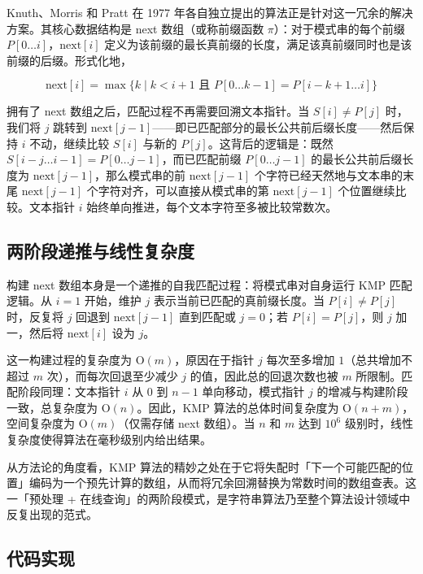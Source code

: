 \documentclass[12pt, a4paper]{academics}
\begin{document}
Knuth、Morris 和 Pratt 在 1977 年各自独立提出的算法正是针对这一冗余的解决方案。其核心数据结构是 next 数组（或称前缀函数 $\pi$）：对于模式串的每个前缀 $P[0 \dots i]$，$\mathrm{next}[i]$ 定义为该前缀的最长真前缀的长度，满足该真前缀同时也是该前缀的后缀。形式化地，

\[
\mathrm{next}[i] = \max\{ k \mid k < i + 1 \text{ 且 } P[0 \dots k-1] = P[i-k+1 \dots i] \}
\]

拥有了 next 数组之后，匹配过程不再需要回溯文本指针。当 $S[i] \neq P[j]$ 时，我们将 $j$ 跳转到 $\mathrm{next}[j-1]$——即已匹配部分的最长公共前后缀长度——然后保持 $i$ 不动，继续比较 $S[i]$ 与新的 $P[j]$。这背后的逻辑是：既然 $S[i-j \dots i-1] = P[0 \dots j-1]$，而已匹配前缀 $P[0 \dots j-1]$ 的最长公共前后缀长度为 $\mathrm{next}[j-1]$，那么模式串的前 $\mathrm{next}[j-1]$ 个字符已经天然地与文本串的末尾 $\mathrm{next}[j-1]$ 个字符对齐，可以直接从模式串的第 $\mathrm{next}[j-1]$ 个位置继续比较。文本指针 $i$ 始终单向推进，每个文本字符至多被比较常数次。

\subsection{两阶段递推与线性复杂度}

构建 next 数组本身是一个递推的自我匹配过程：将模式串对自身运行 KMP 匹配逻辑。从 $i = 1$ 开始，维护 $j$ 表示当前已匹配的真前缀长度。当 $P[i] \neq P[j]$ 时，反复将 $j$ 回退到 $\mathrm{next}[j-1]$ 直到匹配或 $j = 0$；若 $P[i] = P[j]$，则 $j$ 加一，然后将 $\mathrm{next}[i]$ 设为 $j$。

这一构建过程的复杂度为 $\mathrm{O}(m)$，原因在于指针 $j$ 每次至多增加 $1$（总共增加不超过 $m$ 次），而每次回退至少减少 $j$ 的值，因此总的回退次数也被 $m$ 所限制。匹配阶段同理：文本指针 $i$ 从 $0$ 到 $n-1$ 单向移动，模式指针 $j$ 的增减与构建阶段一致，总复杂度为 $\mathrm{O}(n)$。因此，KMP 算法的总体时间复杂度为 $\mathrm{O}(n + m)$，空间复杂度为 $\mathrm{O}(m)$（仅需存储 next 数组）。当 $n$ 和 $m$ 达到 $10^6$ 级别时，线性复杂度使得算法在毫秒级别内给出结果。

从方法论的角度看，KMP 算法的精妙之处在于它将失配时「下一个可能匹配的位置」编码为一个预先计算的数组，从而将冗余回溯替换为常数时间的数组查表。这一「预处理 + 在线查询」的两阶段模式，是字符串算法乃至整个算法设计领域中反复出现的范式。

\subsection{代码实现}

\inputminted{c++}{../src/p2_kmp.cpp}
\end{document}
